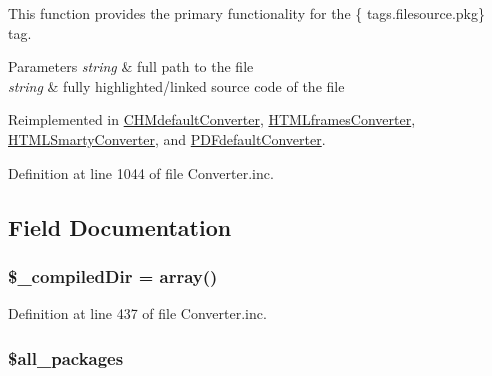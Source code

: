 \-This function provides the primary functionality for the \{ tags.\-filesource.\-pkg\} tag. 
\begin{DoxyParams}{\-Parameters}
{\em string} & full path to the file \\
\hline
{\em string} & fully highlighted/linked source code of the file  \\
\hline
\end{DoxyParams}


\-Reimplemented in \hyperlink{class_c_h_mdefault_converter_abd54588ec4cf2a0c5d087031485f932e}{\-C\-H\-Mdefault\-Converter}, \hyperlink{class_h_t_m_lframes_converter_abd54588ec4cf2a0c5d087031485f932e}{\-H\-T\-M\-Lframes\-Converter}, \hyperlink{class_h_t_m_l_smarty_converter_abd54588ec4cf2a0c5d087031485f932e}{\-H\-T\-M\-L\-Smarty\-Converter}, and \hyperlink{class_p_d_fdefault_converter_abd54588ec4cf2a0c5d087031485f932e}{\-P\-D\-Fdefault\-Converter}.



\-Definition at line 1044 of file \-Converter.\-inc.




\subsection{\-Field \-Documentation}
\hypertarget{class_converter_a5aad015a445fe38f98b819e074a79299}{
\subsubsection[{\$\-\_\-compiled\-Dir}]{\setlength{\rightskip}{0pt plus 5cm}\$\-\_\-compiled\-Dir = array()}}\label{class_converter_a5aad015a445fe38f98b819e074a79299}


\-Definition at line 437 of file \-Converter.\-inc.

\hypertarget{class_converter_a2239e82b48c3085715b2bade1d08779c}{
\subsubsection[{\$all\-\_\-packages}]{\setlength{\rightskip}{0pt plus 5cm}\$all\-\_\-packages}}\label{class_converter_a2239e82b48c3085715b2bade1d08779c}


